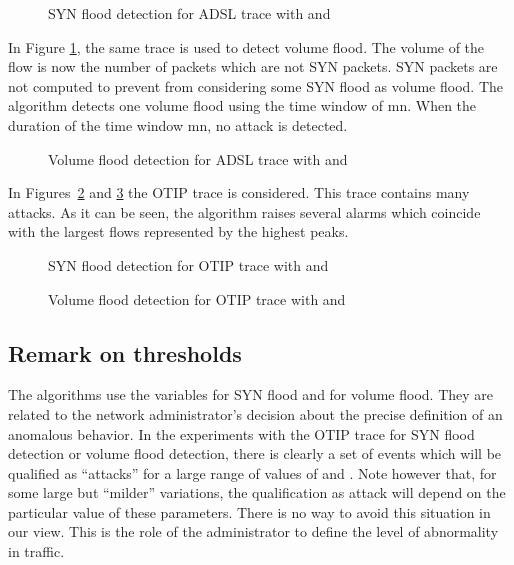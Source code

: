 \documentclass{amsart}
\begin{document}
\begin{figure}[hbtp]
\caption{SYN flood detection for ADSL  trace with  and }
\end{figure}

In Figure \ref{fig8}, the same trace is used to detect volume flood. The
volume of the flow is now the number of packets which are not SYN packets. SYN packets are not computed
to prevent from considering some SYN flood as volume flood. The algorithm detects one
volume flood using the time window of  mn. When the duration of the time window
 mn, no attack is detected. 

\begin{figure}[hbtp]
\caption{Volume flood detection for ADSL trace with  and  \label{fig8}}
\end{figure}

In Figures~\ref{fig9} and \ref{fig10} the OTIP trace is considered. This trace contains
many attacks. As it can be seen, the algorithm raises several alarms which coincide with
the largest flows represented by the highest peaks. 
 
\begin{figure}[hbtp]
\caption{SYN flood detection for OTIP trace with  and  \label{fig9} }
\end{figure}

\begin{figure}[hbtp]
\caption{Volume flood detection for OTIP trace with  and  \label{fig10}}
\end{figure}

\subsection{Remark on thresholds}

The algorithms use  the variables  for SYN  flood and  for volume  flood.  They are
related  to  the network  administrator's  decision about  the  precise  definition of  an
anomalous behavior.   In the experiments  with the OTIP  trace for SYN flood  detection or
volume  flood detection,  there is  clearly a  set of  events which  will be  qualified as
``attacks'' for a large range of values of  and . Note however that, for some large
but ``milder'' variations, the qualification as attack will depend on the particular value
of these parameters. There is no way to avoid this situation in our view. This is the role
of the administrator to define the level of abnormality in traffic.
\end{document}
